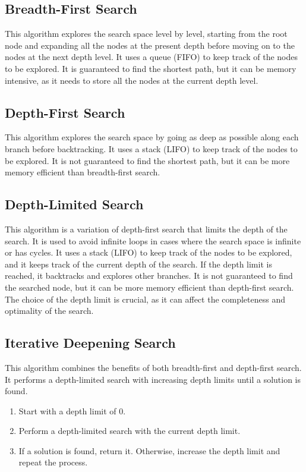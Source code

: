 \subsection{Breadth-First Search}

This algorithm explores the search space level by level, starting from the root node and expanding all the nodes at the present depth before moving on to the nodes at the next depth level. It uses a queue (FIFO) to keep track of the nodes to be explored. It is guaranteed to find the shortest path, but it can be memory intensive, as it needs to store all the nodes at the current depth level.

\subsection{Depth-First Search}

This algorithm explores the search space by going as deep as possible along each branch before backtracking. It uses a stack (LIFO) to keep track of the nodes to be explored. It is not guaranteed to find the shortest path, but it can be more memory efficient than breadth-first search.

\subsection{Depth-Limited Search}

This algorithm is a variation of depth-first search that limits the depth of the search. It is used to avoid infinite loops in cases where the search space is infinite or has cycles. It uses a stack (LIFO) to keep track of the nodes to be explored, and it keeps track of the current depth of the search. If the depth limit is reached, it backtracks and explores other branches. It is not guaranteed to find the searched node, but it can be more memory efficient than depth-first search. The choice of the depth limit is crucial, as it can affect the completeness and optimality of the search.

\subsection{Iterative Deepening Search}

This algorithm combines the benefits of both breadth-first and depth-first search. It performs a depth-limited search with increasing depth limits until a solution is found.
\begin{enumerate}
    \item Start with a depth limit of 0.
    \item Perform a depth-limited search with the current depth limit.
    \item If a solution is found, return it. Otherwise, increase the depth limit and repeat the process.
\end{enumerate}

